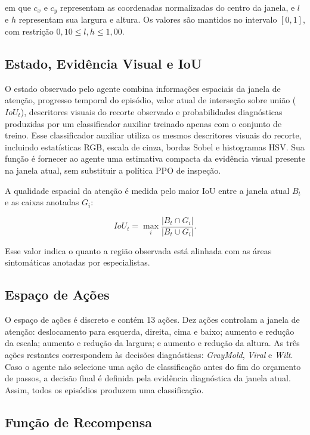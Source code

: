 \noindent em que $c_x$ e $c_y$ representam as coordenadas normalizadas do centro da
janela, e $l$ e $h$ representam sua largura e altura. Os valores são mantidos no
intervalo $[0,1]$, com restrição $0{,}10 \leq l,h \leq 1{,}00$.

\subsection{Estado, Evidência Visual e IoU}

O estado observado pelo agente combina informações espaciais da janela de atenção,
progresso temporal do episódio, valor atual de interseção sobre união ($IoU_t$),
descritores visuais do recorte observado e probabilidades diagnósticas produzidas por
um classificador auxiliar treinado apenas com o conjunto de treino. Esse classificador
auxiliar utiliza os mesmos descritores visuais do recorte, incluindo estatísticas RGB,
escala de cinza, bordas Sobel e histogramas HSV. Sua função é fornecer ao agente uma
estimativa compacta da evidência visual presente na janela atual, sem substituir a
política PPO de inspeção.

A qualidade espacial da atenção é medida pelo maior IoU entre a janela atual $B_t$ e
as caixas anotadas $G_i$:

\begin{equation}
IoU_t = \max_i \frac{|B_t \cap G_i|}{|B_t \cup G_i|}.
\end{equation}

Esse valor indica o quanto a região observada está alinhada com as áreas sintomáticas
anotadas por especialistas.

\subsection{Espaço de Ações}

O espaço de ações é discreto e contém 13 ações. Dez ações controlam a janela de
atenção: deslocamento para esquerda, direita, cima e baixo; aumento e redução da
escala; aumento e redução da largura; e aumento e redução da altura. As três ações
restantes correspondem às decisões diagnósticas: \textit{GrayMold}, \textit{Viral} e
\textit{Wilt}. Caso o agente não selecione uma ação de classificação antes do fim do
orçamento de passos, a decisão final é definida pela evidência diagnóstica da janela
atual. Assim, todos os episódios produzem uma classificação.

\subsection{Função de Recompensa}

